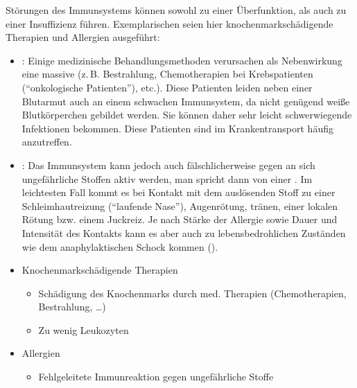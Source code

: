 \TextSlide
{\TxBeschreibung}%
{%
Störungen des Immunsystems können sowohl zu einer
Überfunktion, als auch zu einer Insuffizienz führen.
Exemplarischen seien hier knochenmarkschädigende Therapien
und Allergien ausgeführt: 
\begin{itemize}
  \item {}:
   Einige
  medizinische Behandlungsmethoden verursachen als
  Nebenwirkung eine massive  (z.\,B.
  Bestrahlung, Chemotherapien bei Krebspatienten
  (\enquote{onkologische Patienten}), etc.). Diese Patienten
  leiden neben einer Blutarmut auch an einem schwachen
  Immunsystem, da nicht genügend weiße Blutkörperchen
  gebildet werden. Sie können daher sehr leicht
  schwerwiegende Infektionen bekommen.
  Diese Patienten
  sind im Krankentransport häufig anzutreffen.
  \item {}:
  \label{topic:allergie}
  Das Immunsystem kann jedoch auch fälschlicherweise gegen
  an sich ungefährliche Stoffen aktiv werden, man spricht dann von einer . 
  Im leichtesten
  Fall kommt es bei Kontakt mit dem auslösenden Stoff zu
  einer Schleimhautreizung (\enquote{laufende Nase}),
  Augenrötung, tränen, einer lokalen Rötung bzw. einem
  Juckreiz. Je nach Stärke der Allergie sowie Dauer und
  Intensität des Kontakts kann es aber auch zu
  lebensbedrohlichen Zuständen wie dem anaphylaktischen
  Schock kommen
  ().
\end{itemize}
}%
{
\begin{itemize}
  \item Knochenmarkschädigende Therapien
  \begin{itemize}
    \item Schädigung des Knochenmarks durch med. Therapien (Chemotherapien,
    Bestrahlung, \ldots)
    \item Zu wenig Leukozyten
  \end{itemize}
  \item Allergien
  \begin{itemize}
    \item Fehlgeleitete Immunreaktion gegen ungefährliche Stoffe
  \end{itemize}
\end{itemize}
}%










